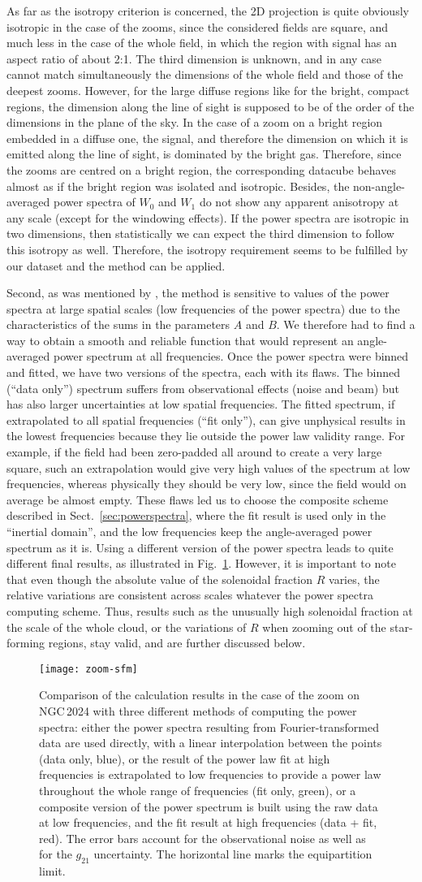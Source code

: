 \documentclass[structabstract]{aa}
\newcommand{\FigCompare}{%
  \begin{figure}
    \centering
    \texttt{[image: zoom-sfm]}
    \caption{Comparison of the calculation results in the case of the zoom on NGC\,2024 with three different methods of computing the power spectra: either the power spectra resulting from Fourier-transformed data are used directly, with a linear interpolation between the points (data only, blue), or the result of the power law fit at high frequencies is extrapolated to low frequencies to provide a power law throughout the whole range of frequencies (fit only, green), or a composite version of the power spectrum is built using the raw data at low frequencies, and the fit result at high frequencies (data + fit, red). The error bars account for the observational noise as well as for the $g_{21}$ uncertainty. The horizontal line marks the equipartition limit.}
    \label{fig:compare}
  \end{figure}}
\begin{document}
As far as the isotropy criterion is concerned, the 2D projection is quite obviously isotropic in the case of the zooms, since the considered fields are square, and much less in the case of the whole field, in which the region with signal has an aspect ratio of about 2:1. The third dimension is unknown, and in any case cannot match simultaneously the dimensions of the whole field and those of the deepest zooms. However, for the large diffuse regions like for the bright, compact regions, the dimension along the line of sight is supposed to be of the order of the dimensions in the plane of the sky. In the case of a zoom on a bright region embedded in a diffuse one, the signal, and therefore the dimension on which it is emitted along the line of sight, is dominated by the bright gas. Therefore, since the zooms are centred on a bright region, the corresponding datacube behaves almost as if the bright region was isolated and isotropic. Besides, the non-angle-averaged power spectra of $W_0$ and $W_1$ do not show any apparent anisotropy at any scale (except for the windowing  effects). If the power spectra are isotropic in two dimensions, then statistically we can expect the third dimension to follow this isotropy as well. Therefore, the isotropy requirement seems to be fulfilled by our dataset and the method can be applied.

Second, as was mentioned by \citet{brunt14}, the method is sensitive to values of the power spectra at large spatial scales (low frequencies of the power spectra) due to the characteristics of the sums in the parameters $A$ and $B$. We therefore had to find a way to obtain a smooth and reliable function that would represent an angle-averaged power spectrum at all frequencies. Once the power spectra were binned and fitted, we have two versions of the spectra, each with its flaws. The binned (``data only'') spectrum suffers from observational effects (noise and beam) but has also larger uncertainties at low spatial frequencies. The fitted spectrum, if extrapolated to all spatial frequencies (``fit only''), can give unphysical results in the lowest frequencies because they lie outside the power law validity range. For example, if the field had been zero-padded all around to create a very large square, such an extrapolation would give very high values of the spectrum at low frequencies, whereas physically they should be very low, since the field would on average be almost empty. These flaws led us to choose the composite scheme described in Sect.~\ref{sec:powerspectra}, where the fit result is used only in the ``inertial domain'', and the low frequencies keep the angle-averaged power spectrum as it is. Using a different version of the power spectra leads to quite different final results, as illustrated in Fig.~\ref{fig:compare}. However, it is important to note that even though the absolute value of the solenoidal fraction $R$ varies, the relative variations are consistent across scales whatever the power spectra computing scheme. Thus, results such as the unusually high solenoidal fraction at the scale of the whole cloud, or the variations of $R$ when zooming out of the star-forming regions, stay valid, and are further discussed below.
\FigCompare{}
\end{document}
